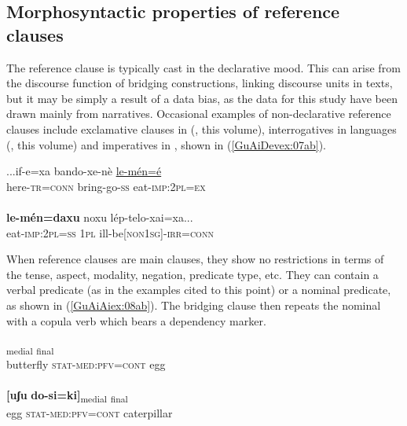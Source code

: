 \documentclass[output=paper]{LSP/langsci}
\begin{document}
\subsection{Morphosyntactic properties of reference clauses}
\label{GuAi2.2Morphosy.ref.cl}

The reference clause is typically cast in the declarative mood. This can arise from the discourse function of bridging constructions, linking discourse units in  texts, but it may be simply a result of a data bias, as the data for this study have been drawn mainly from narratives. Occasional examples of non-declarative reference clauses include exclamative clauses in  (\citeauthor{guerinchap18}, this volume), interrogatives in  languages (\citeauthor{anker18}, this volume) and imperatives in , shown in (\ref{GuAiDevex:07ab}).

\begin{exe}
\ex \label{GuAiDevex:07ab}
\begin{xlist}
\ex \label{GuAiDevex:07a}						
\gll ...if-e=xa bando-xe-nè \underline{le-mén=é}\\
here-\textsc{tr=conn} bring-go-\textsc{ss} eat-\textsc{imp:2pl=ex}\\
\glt {}\\
\ex \label{GuAiDevex:07b}						
\gll \textbf{le-mén=daxu} noxu  lép-telo-xai=xa...\\
eat-\textsc{imp:2pl=ss} \textsc{1pl} ill-be\textsc{[non1sg]-irr=conn} \\
\glt {} 
\end{xlist}
\end{exe}


When reference clauses are main clauses, they show no restrictions in terms of the tense, aspect, modality, negation, predicate type, etc. They can contain a verbal predicate (as in the examples cited to this point) or a nominal predicate, as shown in (\ref{GuAiAiex:08ab}). The bridging clause then repeats the nominal with a copula verb which bears a dependency marker.
\pagebreak

\begin{exe}
\ex \label{GuAiAiex:08ab}
\begin{xlist}
\ex \label{GuAiAiex:08a}
\gll [ɛjaːgɛ	do-si=ki]\textsubscript{medial} \underline{\smash{[uʃu]}}\textsubscript{final}\\
butterfly \textsc{stat}-\textsc{med}:\textsc{pfv}=\textsc{cont} egg\\
\glt {}\\
\ex \label{GuAiAiex:08b}
\gll \textbf{[uʃu}	\textbf{do-si=ki]}\textsubscript{medial}	\underline{\smash{[kɛkɛbɛaːnɛ]}}\textsubscript{final}\\
egg	\textsc{stat}-\textsc{med}:\textsc{pfv}=\textsc{cont} caterpillar\\
\glt {}
\end{xlist}
\end{exe}
\end{document}
